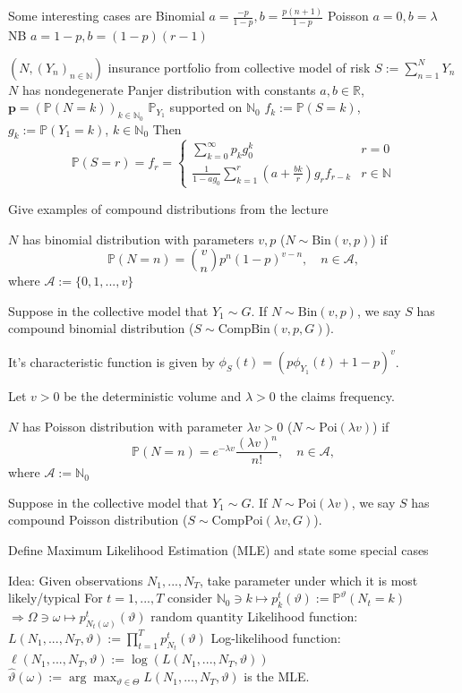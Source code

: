 Some interesting cases are
Binomial
\( a = \frac{-p}{1-p}, b = \frac{p(n+1)}{1-p} \)
Poisson
\( a = 0, b = \lambda \)
NB
\( a = 1-p, b = (1-p)(r-1) \)

\((N, (Y_n)_{n \in \mathbb{N}})\) insurance portfolio from collective model of risk
\(S := \sum_{n=1}^N Y_n\)
\( N \) has nondegenerate Panjer distribution with constants \(a, b \in \mathbb{R}\), \(\mathbf{p} = (\mathbb{P}(N=k))_{k \in \mathbb{N}_0}\)
\(\mathbb{P}_{Y_1}\) supported on \(\mathbb{N}_0\)
\(f_k := \mathbb{P}(S=k)\), \(g_k := \mathbb{P}(Y_1 = k)\), \(k \in \mathbb{N}_0\)
Then
\[
\mathbb{P}(S=r) = f_r = 
\begin{cases}
    \sum_{k=0}^\infty p_k g_0^k & r=0 \\
    \frac{1}{1-ag_0} \sum_{k=1}^r \left(a + \frac{b k}{r}\right) g_r f_{r-k} & r \in \mathbb{N}
\end{cases}
\]

Give examples of compound distributions from the lecture


\(N\) has binomial distribution with parameters \(v, p\) (\(N \sim \text{Bin}(v, p)\)) if
\[
\mathbb{P}(N=n) = \binom{v}{n} p^n (1-p)^{v-n}, \quad n \in \mathcal{A},
\]
where \(\mathcal{A} := \{0, 1, ..., v\}\)

Suppose in the collective model that \(Y_1 \sim G\). 
If \(N \sim \text{Bin}(v, p)\), we say \(S\) has compound binomial distribution (\(S \sim \text{CompBin}(v, p, G)\)).

It's characteristic function is given by \( \phi_S(t) = (p\phi_{Y_1}(t) + 1 - p)^v \).

Let \( v > 0 \) be the deterministic volume and \( \lambda > 0 \) the claims frequency.

\(N\) has Poisson distribution with parameter \(\lambda v > 0\) (\(N \sim \text{Poi}(\lambda v)\)) if
\[
\mathbb{P}(N=n) = e^{-\lambda v} \frac{(\lambda v)^n}{n!}, \quad n \in \mathcal{A},
\]
where \(\mathcal{A} := \mathbb{N}_0\)

Suppose in the collective model that \(Y_1 \sim G\). 
If \(N \sim \text{Poi}(\lambda v)\), we say \(S\) has compound Poisson distribution (\(S \sim \text{CompPoi}(\lambda v, G)\)).


Define Maximum Likelihood Estimation (MLE) and state some special cases

Idea: Given observations \(N_1, ..., N_T\), take parameter under which it is most likely/typical
For \(t = 1, ..., T\) consider
\(
\mathbb{N}_0 \ni k \mapsto p_k^t(\vartheta) := \mathbb{P}^\vartheta(N_t = k)
\)
\(
\Rightarrow \Omega \ni \omega \mapsto p_{N_t(\omega)}^t(\vartheta) \text{ random quantity}
\)
Likelihood function:
\(
L(N_1, ..., N_T, \vartheta) := \prod_{t=1}^T p_{N_t}^t(\vartheta)
\)
Log-likelihood function:
\(
\ell(N_1, ..., N_T, \vartheta) := \log(L(N_1, ..., N_T, \vartheta))
\)
\(
\widehat{\vartheta}(\omega) := \arg \max_{\vartheta \in \Theta} L(N_1, ..., N_T, \vartheta)\) is the MLE.

